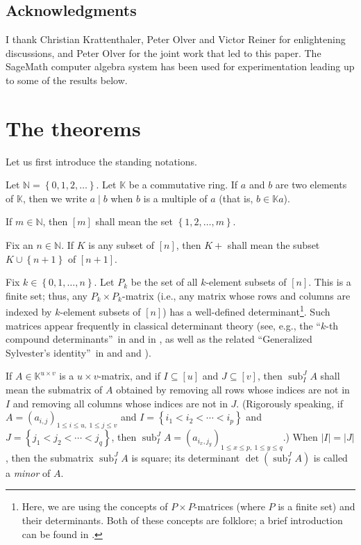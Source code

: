 \documentclass[numbers=enddot,12pt,final,onecolumn,notitlepage]{scrartcl}%
\theoremstyle{definition}
\begin{document}
\subsection*{Acknowledgments}

I thank Christian Krattenthaler, Peter Olver and Victor Reiner for
enlightening discussions, and Peter Olver for the joint work that led to this
paper. The SageMath computer algebra system \cite{SageMath} has been used for
experimentation leading up to some of the results below.

\section{The theorems}

Let us first introduce the standing notations.

Let $\mathbb{N}=\left\{  0,1,2,\ldots\right\}  $. Let $\mathbb{K}$ be a
commutative ring. If $a$ and $b$ are two elements of $\mathbb{K}$, then we
write $a\mid b$ when $b$ is a multiple of $a$ (that is, $b\in\mathbb{K}a$).

If $m\in\mathbb{N}$, then $\left[  m\right]  $ shall mean the set $\left\{
1,2,\ldots,m\right\}  $.

Fix an $n\in\mathbb{N}$. If $K$ is any subset of $\left[  n\right]  $, then
$K+$ shall mean the subset $K\cup\left\{  n+1\right\}  $ of $\left[
n+1\right]  $.

Fix $k\in\left\{  0,1,\ldots,n\right\}  $. Let $P_{k}$ be the set of all
$k$-element subsets of $\left[  n\right]  $. This is a finite set; thus, any
$P_{k}\times P_{k}$-matrix (i.e., any matrix whose rows and columns are
indexed by $k$-element subsets of $\left[  n\right]  $) has a well-defined
determinant\footnote{Here, we are using the concepts of $P \times P$-matrices
(where $P$ is a finite set) and their determinants. Both of these concepts are
folklore; a brief introduction can be found in \cite[\S 1]{Grinbe18}.}. Such
matrices appear frequently in classical determinant theory (see, e.g., the
\textquotedblleft$k$-th compound determinants\textquotedblright\ in
\cite{MuiMet60} and in \cite[\S 2.6]{Prasolov}, as well as the related
\textquotedblleft Generalized Sylvester's identity\textquotedblright\ in
\cite[\S 2.7]{Prasolov} and \cite[Teorema 2.9.1]{Prasol15} and \cite{Mohr53}).

If $A\in\mathbb{K}^{u\times v}$ is a $u\times v$-matrix, and if $I\subseteq
\left[  u\right]  $ and $J\subseteq\left[  v\right]  $, then
$\operatorname*{sub}\nolimits_{I}^{J}A$ shall mean the submatrix of $A$
obtained by removing all rows whose indices are not in $I$ and removing all
columns whose indices are not in $J$. (Rigorously speaking, if $A=\left(
a_{i,j}\right)  _{1\leq i\leq u,\ 1\leq j\leq v}$ and $I=\left\{  i_{1}%
<i_{2}<\cdots<i_{p}\right\}  $ and $J=\left\{  j_{1}<j_{2}<\cdots
<j_{q}\right\}  $, then $\operatorname*{sub}\nolimits_{I}^{J}A=\left(
a_{i_{x},j_{y}}\right)  _{1\leq x\leq p,\ 1\leq y\leq q}$.) When $\left\vert
I\right\vert =\left\vert J\right\vert $, then the submatrix
$\operatorname*{sub}\nolimits_{I}^{J}A$ is square; its determinant
$\det\left(  \operatorname*{sub}\nolimits_{I}^{J}A\right)  $ is called a
\textit{minor} of $A$.
\end{document}
